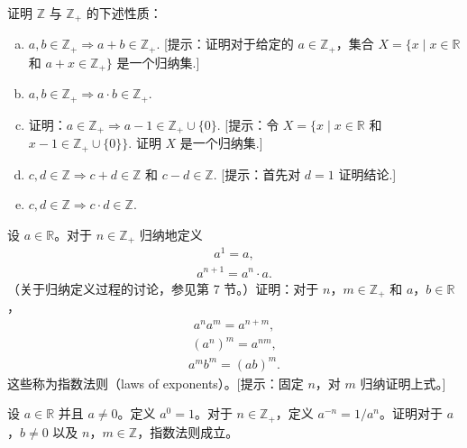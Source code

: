 \documentclass[../../main.tex]{subfiles}
\begin{document}
\begin{exercise}\label{exercise:ch01-整数与实数-5}
证明 $\mathbb{Z}$ 与 $\mathbb{Z}_{+}$ 的下述性质：
\begin{enumerate}[(a)]
\item $a, b \in \mathbb{Z}_{+} \Longrightarrow a + b \in \mathbb{Z}_{+}$. [提示：证明对于给定的 $a \in \mathbb{Z}_{+}$，集合 $X = \{x \mid x \in \mathbb{R}$ 和 $a + x \in \mathbb{Z}_{+}\}$ 是一个归纳集.]
\item $a, b \in \mathbb{Z}_{+} \Longrightarrow a \cdot b \in \mathbb{Z}_{+}$.
\item 证明：$a \in \mathbb{Z}_{+} \Longrightarrow a - 1 \in \mathbb{Z}_{+} \cup \{0\}$. [提示：令 $X = \{x \mid x \in \mathbb{R}$ 和 $x - 1 \in \mathbb{Z}_{+} \cup \{0\}\}$. 证明 $X$ 是一个归纳集.]
\item $c, d \in \mathbb{Z} \Longrightarrow c + d \in \mathbb{Z}$ 和 $c - d \in \mathbb{Z}$. [提示：首先对 $d = 1$ 证明结论.]
\item $c, d \in \mathbb{Z} \Longrightarrow c \cdot d \in \mathbb{Z}$.
\end{enumerate}
\end{exercise}

\begin{exercise}\label{exercise:ch01-整数与实数-6}
设 $a \in \mathbb{R}$。对于 $n \in \mathbb{Z}_{+}$ 归纳地定义
\begin{align*}
a^{1} = a,
\end{align*}
\begin{align*}
a^{n+1} = a^{n} \cdot a.
\end{align*}
（关于归纳定义过程的讨论，参见第 7 节。）证明：对于 $n$，$m \in \mathbb{Z}_{+}$ 和 $a$，$b \in \mathbb{R}$，
\begin{align*}
a^{n}a^{m} = a^{n+m},
\end{align*}
\begin{align*}
(a^{n})^{m} = a^{nm},
\end{align*}
\begin{align*}
a^{m}b^{m} = (ab)^{m}.
\end{align*}
这些称为指数法则（laws of exponents）。[提示：固定 $n$，对 $m$ 归纳证明上式。]
\end{exercise}

\begin{exercise}\label{exercise:ch01-整数与实数-7}
设 $a \in \mathbb{R}$ 并且 $a \neq 0$。定义 $a^{0} = 1$。对于 $n \in \mathbb{Z}_{+}$，定义 $a^{-n} = 1/a^{n}$。证明对于 $a$，$b \neq 0$ 以及 $n$，$m \in \mathbb{Z}$，指数法则成立。
\end{exercise}
\end{document}

